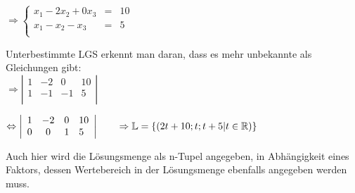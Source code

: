 \documentclass[main.tex]{subfiles}
\begin{document}
$\Rightarrow \left \{ \begin{array}{rcl}
x_{1}-2x_{2}+0x_{3}&=&10\\
x_{1}-x_{2}-x_{3}& =& 5\\
\end{array} \right .$

Unterbestimmte LGS erkennt man daran, dass es mehr unbekannte als Gleichungen gibt:\\

$\Rightarrow \left \vert \begin{array}{rccl}
    1&-2&0&10\\
    1&-1&-1& 5 \\
\end{array}\right\vert$

$\Leftrightarrow \left\vert \begin{array}{rccl}
1&-2&0&10\\
0&0&1&5 \\
\end{array}\right\vert \qquad \Rightarrow \mathbb{L} = \{ (2t+10;t;t+5|t \in \mathbb{R} ) \}$

Auch hier wird die Lösungsmenge als n-Tupel angegeben, in Abhängigkeit eines Faktors, dessen Wertebereich in der Lösungsmenge ebenfalls angegeben werden muss.
\end{document}
